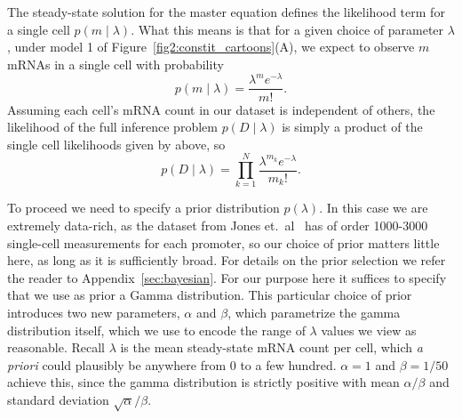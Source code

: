 The steady-state solution for the master equation defines the likelihood term
for a single cell $p(m \mid \lambda)$. What this means is that for a given
choice of parameter $\lambda$, under model 1 of
Figure~\ref{fig2:constit_cartoons}(A), we expect to observe $m$ mRNAs in a
single cell with probability
\begin{equation}
p(m\mid\lambda) = \frac{\lambda^m e^{-\lambda}}{m!}.
\label{eq:poisson_inference010}
\end{equation}
Assuming each cell's mRNA count in our dataset is independent of others, the
likelihood of the full inference problem $p(D\mid\lambda)$ is simply a product
of the single cell likelihoods given by  above, so
\begin{equation}
p(D\mid\lambda) = \prod_{k=1}^N \frac{\lambda^{m_k}e^{-\lambda}}{m_k!}.
\end{equation}

To proceed we need to specify a prior distribution $p(\lambda)$. In this case we
are extremely data-rich, as the dataset from Jones et.\ al~\cite{Jones2014} has
of order 1000-3000 single-cell measurements for each promoter, so our choice of
prior matters little here, as long as it is sufficiently broad. For details on
the prior selection we refer the reader to Appendix~\ref{sec:bayesian}. For our
purpose here it suffices to specify that we use as prior a Gamma distribution.
This particular choice of prior introduces two new parameters, $\alpha$ and
$\beta$, which parametrize the gamma distribution itself, which we use to encode
the range of $\lambda$ values we view as reasonable. Recall $\lambda$ is the
mean steady-state mRNA count per cell, which \textit{a priori} could plausibly
be anywhere from 0 to a few hundred. $\alpha=1$ and $\beta=1/50$ achieve this,
since the gamma distribution is strictly positive with mean $\alpha/\beta$ and
standard deviation $\sqrt{\alpha}/\beta$.

